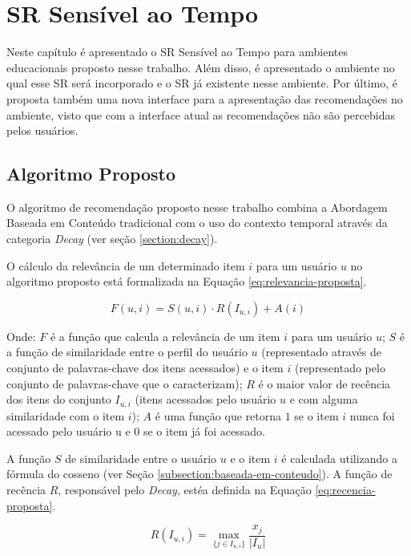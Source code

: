 \chapter{SR Sensível ao Tempo}\label{cap:proposta}

Neste capítulo é apresentado o SR Sensível ao Tempo para ambientes educacionais proposto nesse trabalho. Além disso, é apresentado
o ambiente no qual esse SR será incorporado e o SR já existente nesse ambiente. Por último, é proposta também uma nova interface
para a apresentação das recomendações no ambiente, visto que com a interface atual as recomendações não são percebidas pelos
usuários.

\section{Algoritmo Proposto}

O algoritmo de recomendação proposto nesse trabalho combina a Abordagem Baseada em Conteúdo tradicional com o uso do
contexto temporal através da categoria \textit{Decay} (ver seção \ref{section:decay}).

O cálculo da relevância de um determinado item $i$ para um usuário $u$ no algoritmo proposto está formalizada na Equação
\ref{eq:relevancia-proposta}.

\begin{equation}
  F(u,i) = S(u,i) \cdot R(I_{u,i}) + A(i)
  \label{eq:relevancia-proposta}
\end{equation}

Onde: $F$ é a função que calcula a relevância de um item $i$ para um usuário $u$; $S$ é a função de similaridade entre
o perfil do usuário $u$ (representado através de conjunto de palavras-chave dos itens acessados) e o item $i$
(representado pelo conjunto de palavras-chave que o caracterizam); $R$ é o maior valor de recência dos itens do conjunto
$I_{u,i}$ (itens acessados pelo usuário $u$ e com alguma similaridade com o item $i$); $A$ é uma função que retorna $1$
se o item $i$ nunca foi acessado pelo usuário u e $0$ se o item já foi acessado.

A função $S$ de similaridade entre o usuário $u$ e o item $i$ é calculada utilizando a fórmula do cosseno (ver Seção
\ref{subsection:baseada-em-conteudo}). A função de recência $R$, responsável pelo \textit{Decay}, estéa definida na Equação
\ref{eq:recencia-proposta}.

\begin{equation}
  R(I_{u,i}) = \max_{\{j \in I_{u,i}\}}{\frac{x_j}{\left| I_u \right|}}
  \label{eq:recencia-proposta}
\end{equation}

